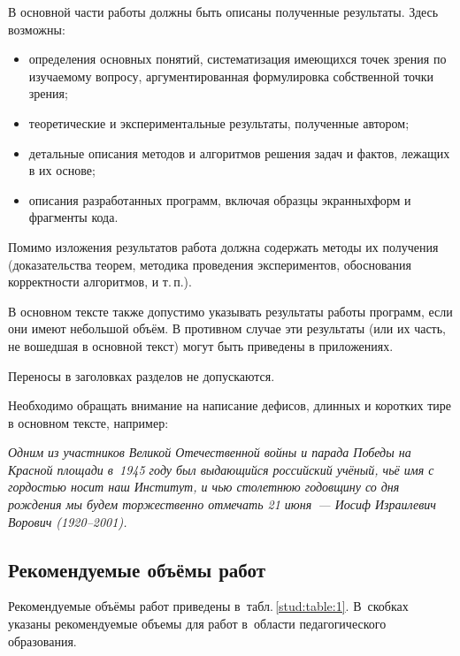 \documentclass[14pt]{mmcs_article}
\begin{document}
В основной части работы должны быть описаны полученные результаты. Здесь возможны:
\begin{itemize}
  \item определения основных понятий, систематизация имеющихся точек зрения по изучаемому вопросу, аргументированная формулировка собственной точки зрения;
  \item теоретические и экспериментальные результаты, полученные автором;
  \item детальные описания методов и алгоритмов решения задач и фактов, лежащих в их основе;
  \item описания разработанных программ, включая образцы экранных\linebreak форм и фрагменты кода.
\end{itemize}

Помимо изложения результатов работа должна содержать методы их получения (доказательства теорем, методика проведения экспериментов, обоснования корректности алгоритмов, и т.\,п.).

В основном тексте также допустимо указывать результаты работы программ, если они имеют небольшой объём. В противном случае эти результаты (или их часть, не вошедшая в основной текст) могут быть приведены в приложениях.


Переносы в заголовках разделов не допускаются.

Необходимо обращать внимание на написание дефисов, длинных и коротких тире в основном тексте, например:

\emph{Одним из участников Великой Отечественной войны и парада Победы на Красной площади в~1945 году был выдающийся российский учёный, чьё имя с гордостью носит наш Институт, и чью столетнюю годовщину со дня рождения мы будем торжественно отмечать 21 июня~--- Иосиф Израилевич Ворович (1920--2001).}


\subsection{Рекомендуемые объёмы работ}

Рекомендуемые объёмы работ приведены в~табл.\,\ref{stud:table:1}. В~скобках указаны рекомендуемые объемы для работ в~области педагогического образования.
\end{document}
